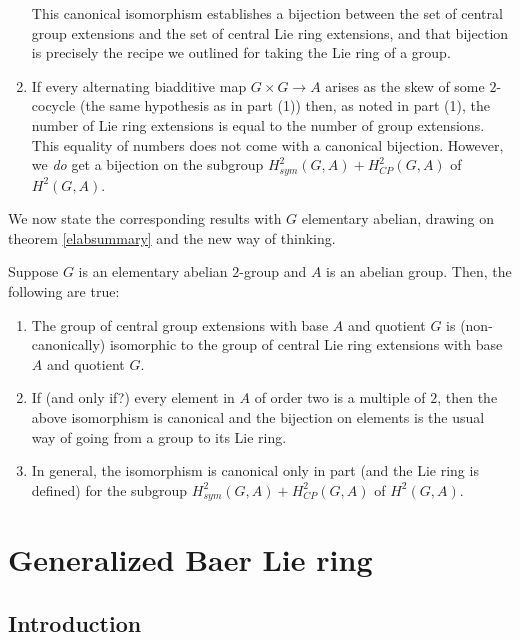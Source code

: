 \documentclass[10pt]{amsart}
\begin{document}
\begin{lemma}
\begin{enumerate}
    This canonical isomorphism establishes a bijection between the set
    of central group extensions and the set of central Lie ring
    extensions, and that bijection is precisely the recipe we outlined
    for taking the Lie ring of a group.
  \item If every alternating biadditive map $G \times G \to A$ arises
    as the skew of some $2$-cocycle (the same hypothesis as in part
    (1)) then, as noted in part (1), the number of Lie ring extensions
    is equal to the number of group extensions. This equality of
    numbers does not come with a canonical bijection. However, we {\em
    do} get a bijection on the subgroup $H^2_{sym}(G,A)
    +H^2_{CP}(G,A)$ of $H^2(G,A)$.
  \end{enumerate}
\end{lemma}

We now state the corresponding results with $G$ elementary abelian,
drawing on theorem \ref{elabsummary} and the new way of thinking.

\begin{theorem}\label{elabsummary2}
  Suppose $G$ is an elementary abelian $2$-group and $A$ is an abelian
  group. Then, the following are true:
  
  \begin{enumerate}
  \item The group of central group extensions with base $A$ and
    quotient $G$ is (non-canonically) isomorphic to the group of
    central Lie ring extensions with base $A$ and quotient $G$.
  \item If (and only if?) every element in $A$ of order two is a
    multiple of $2$, then the above isomorphism is canonical and the
    bijection on elements is the usual way of going from a group to
    its Lie ring.
  \item In general, the isomorphism is canonical only in part (and the
    Lie ring is defined) for the subgroup $H^2_{sym}(G,A) +
    H^2_{CP}(G,A)$ of $H^2(G,A)$.
  \end{enumerate}
\end{theorem}

\section{Generalized Baer Lie ring}

\subsection{Introduction}
\end{document}
